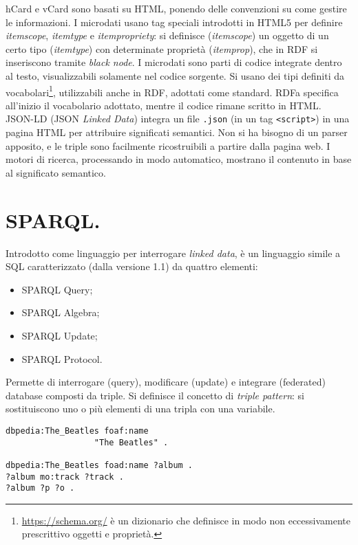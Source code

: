 \documentclass[11pt]{article}
\begin{document}
\begin{multicols}{2}
hCard e vCard sono basati su HTML, ponendo delle convenzioni su come gestire le informazioni. \newline
I microdati usano tag speciali introdotti in HTML5 per definire \textit{itemscope}, \textit{itemtype} e \textit{itempropriety}: si definisce (\textit{itemscope}) un oggetto di un certo tipo (\textit{itemtype}) con determinate proprietà (\textit{itemprop}), che in RDF si inseriscono tramite \textit{black node}.
I microdati sono parti di codice integrate dentro al testo, visualizzabili solamente nel codice sorgente.
Si usano dei tipi definiti da vocabolari\footnote{\url{https://schema.org/} è un dizionario che definisce in modo non eccessivamente prescrittivo oggetti e proprietà.}, utilizzabili anche in RDF, adottati come standard. \newline
RDFa specifica all'inizio il vocabolario adottato, mentre il codice rimane scritto in HTML. \newline
JSON-LD (JSON \textit{Linked Data}) integra un file \verb|.json| (in un tag \verb|<script>|) in una pagina HTML per attribuire significati semantici.
Non si ha bisogno di un parser apposito, e le triple sono facilmente ricostruibili a partire dalla pagina web.
I motori di ricerca, processando in modo automatico, mostrano il contenuto in base al significato semantico.

\section{SPARQL.}
Introdotto come linguaggio per interrogare \textit{linked data}, è un linguaggio simile a SQL caratterizzato (dalla versione 1.1) da quattro elementi:
\begin{itemize}
  \item SPARQL Query;
  \item SPARQL Algebra;
  \item SPARQL Update;
  \item SPARQL Protocol.
\end{itemize}
Permette di interrogare (query), modificare (update) e integrare (federated) database composti da triple.
Si definisce il concetto di \textit{triple pattern}: si sostituiscono uno o più elementi di una tripla con una variabile.

\begin{verbatim}
dbpedia:The_Beatles foaf:name
                  "The Beatles" .

dbpedia:The_Beatles foad:name ?album .
?album mo:track ?track .
?album ?p ?o .
\end{verbatim}


\end{multicols}
\end{document}
